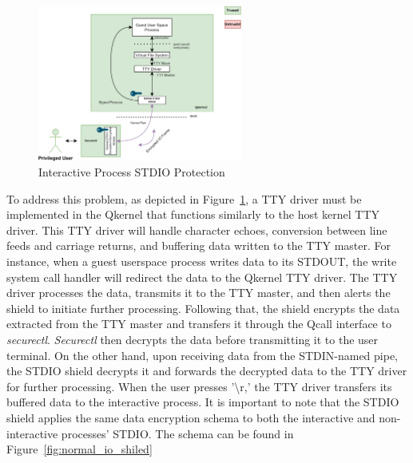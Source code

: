 \begin{figure}[!htb]
    \centering
    \includegraphics[width=0.6\textwidth]{images/terminal_shiled3.png}
    \caption[Interactive Process STDIO Protection]{Interactive Process STDIO Protection}
    \label{fig:terminal_shiled3}
\end{figure}

To address this problem, as depicted in Figure~\ref{fig:terminal_shiled3}, a TTY driver must be implemented in the Qkernel that functions similarly to the host kernel TTY driver. This TTY driver will handle character echoes, conversion between line feeds and carriage returns, and buffering data written to the TTY master. For instance, when a guest userspace 
process writes data to its STDOUT, the write system call handler will redirect the data to the Qkernel TTY driver. The TTY driver processes the data, transmits it to the TTY master, and then alerts the shield to initiate further processing. Following that, the shield encrypts the data extracted from the TTY master and transfers it through the Qcall interface to 
\emph{securectl}.  \emph{Securectl} then decrypts the data before transmitting it to the user terminal. On the other hand, upon receiving data from the STDIN-named pipe, the STDIO shield decrypts it and forwards the decrypted data to the TTY driver for further processing. When the user presses '\textbackslash r,' the TTY driver transfers its buffered data 
to the interactive process. It is important to note that the STDIO shield applies the same data encryption schema to both the interactive and non-interactive processes' STDIO. The schema can be found in Figure~\ref{fig:normal_io_shiled}

